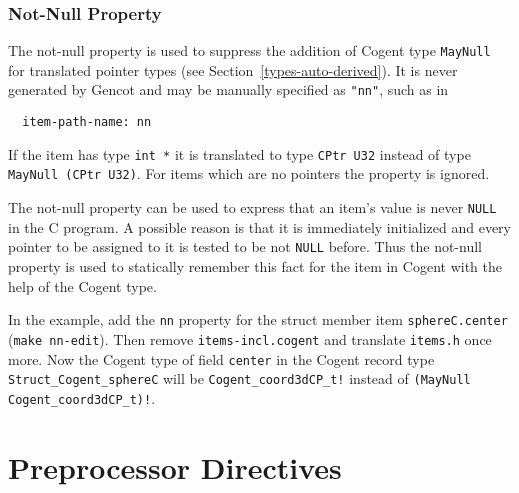 \documentclass[a4paper]{report}
\newcommand{\code}[1]{\textnormal{\texttt{#1}}}
\begin{document}
\subsection{Not-Null Property}
\label{types-manprops-nn}

The not-null property is used to suppress the addition of Cogent type \code{MayNull} for translated pointer types (see 
Section~\ref{types-auto-derived}). It is never generated by Gencot and may be manually specified as \code{"nn"}, such as in 
\begin{verbatim}
  item-path-name: nn
\end{verbatim}
If the item has type \code{int *} it is translated to type \code{CPtr U32} instead of type \code{MayNull (CPtr U32)}.
For items which are no pointers the property is ignored.

The not-null property can be used to express that an item's value is never \code{NULL} in the C program. A possible reason
is that it is immediately initialized and every pointer to be assigned to it is tested to be not \code{NULL} before. 
Thus the not-null property is used to statically remember this fact for the item in Cogent with the help of the Cogent
type.

In the example, add the \code{nn} property for the struct member item \code{sphereC.center} (\code{make nn-edit}). Then 
remove \code{items-incl.cogent} and translate \code{items.h} once more. Now the Cogent type of field \code{center} in
the Cogent record type \code{Struct\_Cogent\_sphereC} will be \code{Cogent\_coord3dCP\_t!} instead of 
\code{(MayNull Cogent\_coord3dCP\_t)!}.

\chapter{Preprocessor Directives}
\label{directives}
\end{document}
